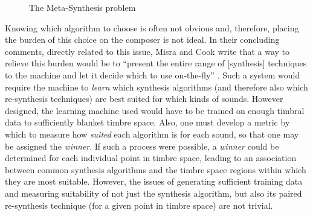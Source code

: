 \documentclass[12pt]{report} 	%
\numberwithin{figure}{chapter}
\numberwithin{table}{chapter}
\numberwithin{equation}{chapter}
\begin{document}
\begin{flushleft}
\begin{figure}[h!]
\begin{center}
\caption[The meta-synthesis problem]{The Meta-Synthesis problem}
\end{center}
\vspace{6pt}
\end{figure}
Knowing which algorithm to choose is often not obvious and, therefore, placing the burden of this choice on the composer is not ideal. In their concluding comments, directly related to this issue, Misra and Cook write that a way to relieve this burden would be to ``present the entire range of [synthesis] techniques to the machine and let it decide which to use on-the-fly''  \cite[p. 5]{Misra:2009km}. Such a system would require the machine to \textit{learn} which synthesis algorithms (and therefore also which re-synthesis techniques) are best suited for which kinds of sounds. However designed, the learning machine used would have to be trained on enough timbral data to sufficiently blanket timbre space. Also, one must develop a metric by which to measure how \textit{suited} each algorithm is for each sound, so that one may be assigned the \textit{winner}. If such a process were possible, a \textit{winner} could be determined for each individual point in timbre space, leading to an association between common synthesis algorithms and the timbre space regions within which they are most suitable. However, the issues of generating sufficient training data and measuring suitability of not just the synthesis algorithm, but also its paired re-synthesis technique (for a given point in timbre space) are not trivial.


\end{flushleft}
\end{document}

